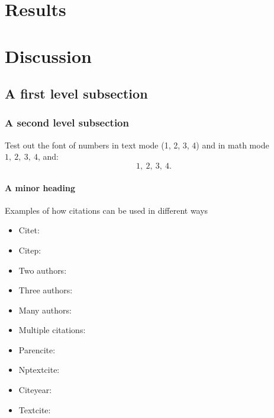 \documentclass[draft]{mpi-far}
\begin{document}
\section{Results}
\section{Discussion}

\subsection{A first level subsection}
\subsubsection{A second level subsection}

Test out the font of  numbers in text mode (1, 2, 3, 4) and in math mode $1,\ 2,\ 3,\ 4$, and:
$$
1,\ 2,\ 3,\ 4 .
$$

\lipsum[3] 


\paragraph{A minor heading}
\lipsum[5] 

Examples of how citations can be used in different ways

\begin{itemize}
  \item Citet: \citet{baker_nzclassification_2010}
  \item Citep: \citep{doc_sealion_2009}
  \item Two authors: \citet{abraham_summary_98-09}
  \item Three authors: \citep{thompson_dolphin_2013}
  \item Many authors: \citep{baker_global_2007}
  \item Multiple citations: \citep{baker_global_2007, abraham_summary_98-09, thompson_dolphin_2013} 
  \item Parencite: \parencite{gales_phocarctos_2008}
  \item Nptextcite: 
  \item Citeyear: \citeyear{robertson_population_2011}
  \item Textcite: \textcite{roe_necropsy_2007}
\end{itemize}
\end{document}
